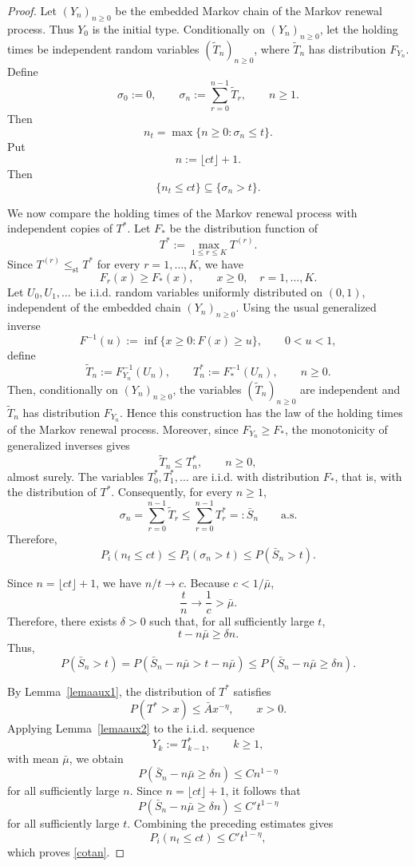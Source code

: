 \documentclass[10pt,a4paper]{amsart}
\begin{document}
\begin{proof}
Let \((Y_n)_{n\ge0}\) be the embedded Markov chain of the Markov renewal
process. Thus \(Y_0\) is the initial type. Conditionally on
\((Y_n)_{n\ge0}\), let the holding times be independent random variables
\((\widetilde T_n)_{n\ge0}\), where \(\widetilde T_n\) has distribution
\(F_{Y_n}\). Define
\[
\sigma_0:=0,
\qquad
\sigma_n:=\sum_{r=0}^{n-1}\widetilde T_r,
\qquad n\ge1.
\]
Then
\[
n_t=\max\{n\ge0:\sigma_n\le t\}.
\]
Put
\[
n:=\lfloor ct\rfloor+1.
\]
Then
\[
\{n_t\le ct\}\subseteq \{\sigma_n>t\}.
\]

We now compare the holding times of the Markov renewal process with
independent copies of \(T^*\). Let \(F_*\) be the distribution function of
\[
T^*:=\max_{1\le r\le K}T^{(r)}.
\]
Since \(T^{(r)}\le_{\mathrm{st}}T^*\) for every \(r=1,\ldots,K\), we have
\[
F_r(x)\ge F_*(x),
\qquad x\ge0,\quad r=1,\ldots,K.
\]
Let \(U_0,U_1,\ldots\) be i.i.d. random variables uniformly distributed on
\((0,1)\), independent of the embedded chain \((Y_n)_{n\ge0}\). Using the
usual generalized inverse
\[
F^{-1}(u):=\inf\{x\ge0:F(x)\ge u\},
\qquad 0<u<1,
\]
define
\[
\widetilde T_n:=F_{Y_n}^{-1}(U_n),
\qquad
T_n^*:=F_*^{-1}(U_n),
\qquad n\ge0.
\]
Then, conditionally on \((Y_n)_{n\ge0}\), the variables
\((\widetilde T_n)_{n\ge0}\) are independent and \(\widetilde T_n\) has
distribution \(F_{Y_n}\). Hence this construction has the law of the holding
times of the Markov renewal process. Moreover, since
\(F_{Y_n}\ge F_*\), the monotonicity of generalized inverses gives
\[
\widetilde T_n\le T_n^*,
\qquad n\ge0,
\]
almost surely. The variables \(T_0^*,T_1^*,\ldots\) are i.i.d. with
distribution \(F_*\), that is, with the distribution of \(T^*\). Consequently,
for every \(n\ge1\),
\[
\sigma_n
=
\sum_{r=0}^{n-1}\widetilde T_r
\le
\sum_{r=0}^{n-1}T_r^*
=:\bar S_n
\qquad\text{a.s.}
\]
Therefore,
\[
P_i(n_t\le ct)
\le
P_i(\sigma_n>t)
\le
P(\bar S_n>t).
\]

Since \(n=\lfloor ct\rfloor+1\), we have \(n/t\to c\). Because
\(c<1/\bar\mu\),
\[
\frac{t}{n}\longrightarrow \frac1c>\bar\mu.
\]
Therefore, there exists \(\delta>0\) such that, for all sufficiently large
\(t\),
\[
t-n\bar\mu\ge \delta n.
\]
Thus,
\[
P(\bar S_n>t)
=
P(\bar S_n-n\bar\mu>t-n\bar\mu)
\le
P(\bar S_n-n\bar\mu\ge \delta n).
\]

By Lemma~\ref{lemaaux1}, the distribution of \(T^*\) satisfies
\[
P(T^*>x)\le \bar A x^{-\eta},
\qquad x>0.
\]
 Applying Lemma~\ref{lemaaux2} to the i.i.d. sequence
 \[
 Y_k:=T_{k-1}^*,
 \qquad k\ge1,
 \]
 with mean \(\bar\mu\), we obtain
 \[
 P(\bar S_n-n\bar\mu\ge \delta n)
 \le
 C n^{1-\eta}
 \]
 for all sufficiently large \(n\). Since \(n=\lfloor ct\rfloor+1\), it follows
that
\[
P(\bar S_n-n\bar\mu\ge \delta n)
\le
C' t^{1-\eta}
\]
for all sufficiently large \(t\). Combining the preceding estimates gives
\[
P_i(n_t\le ct)
\le
C' t^{1-\eta},
\]
which proves \eqref{cotan}.
\end{proof}
\end{document}
